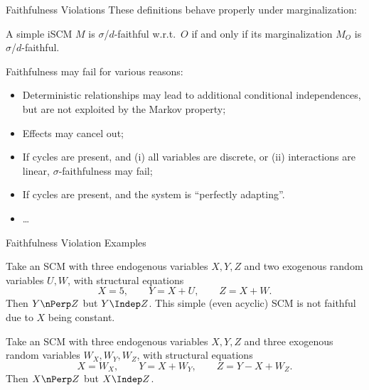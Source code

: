 \begin{frame}{Faithfulness Violations}
These definitions behave properly under marginalization:
\begin{Rem}
A simple iSCM $M$ is $\sigma$/$d$-faithful w.r.t.\ $O$ if and only if
its marginalization $M_O$ is $\sigma$/$d$-faithful.
\end{Rem}

\bigskip
Faithfulness may fail for various reasons:
\begin{itemize}
  \item Deterministic relationships may lead to additional conditional independences, but are not exploited by the Markov property;
  \item Effects may cancel out;
  \item If cycles are present, and (i) all variables are discrete, or (ii) interactions are linear, $\sigma$-faithfulness may fail;
  \item If cycles are present, and the system is ``perfectly adapting''.
  \item \dots
\end{itemize}
\end{frame}

\begin{frame}{Faithfulness Violation Examples}
\begin{Eg}[Determinism]
  Take an SCM with three endogenous variables $X,Y,Z$ and two exogenous random variables $U,W$, with structural equations
  $$X = 5, \qquad Y = X + U, \qquad Z = X + W.$$
  Then $Y \nPerp Z$ but $Y \Indep Z$.
  This simple (even acyclic) SCM is not faithful due to $X$ being constant.
\end{Eg}

\begin{Eg}
  Take an SCM with three endogenous variables $X,Y,Z$ and three exogenous random variables $W_X,W_Y,W_Z$, with structural equations
  $$X = W_X, \qquad Y = X + W_Y, \qquad Z = Y - X + W_Z.$$
  Then $X \nPerp Z$ but $X \Indep Z$.
\end{Eg}
\end{frame}

